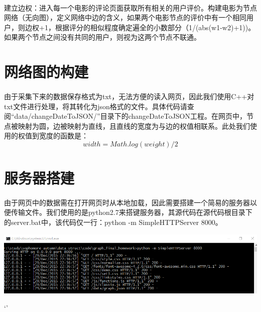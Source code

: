 \documentclass{article}
\begin{document}
\begin{CJK}{UTF8}{gkai}
	\paragraph{}
	建立边权：进入每一个电影的评论页面获取所有相关的用户评价。构建电影为节点网络（无向图），定义网络中边的含义，如果两个电影节点的评价中有一个相同用户，则边权+1，根据评分的相似程度确定遍全的小数部分（1/(abs(w1-w2)+1))。如果两个节点之间没有共同的用户，则视为这两个节点不联通。


\section{网络图的构建} %
	\paragraph{}
	由于采集下来的数据保存格式为txt，无法方便的读入网页，因此我们使用C++对txt文件进行处理，将其转化为json格式的文件。具体代码请查阅“data/changeDateToJSON/”目录下的changeDateToJSON工程。在网页中，节点被映射为圆，边被映射为直线，且直线的宽度为与边的权值相联系。此处我们使用的权值到宽度的函数是：
		$$width = Math.log(weight) / 2$$

\section{服务器搭建} %
	\paragraph{}
	由于网页中的数据需在打开网页时从本地加载，因此需要搭建一个简易的服务器以便传输文件。我们使用的是python2.7来搭键服务器，其源代码在源代码根目录下的server.bat中，该代码仅一行：python -m SimpleHTTPServer 8000。
	\\[\intextsep] 
	\begin{minipage}{\textwidth} 
	    \centering 
	    \includegraphics[width=0.9\linewidth]{server.PNG}
	\end{minipage} `'
	\\[\intextsep] 


\end{CJK}
\end{document}
